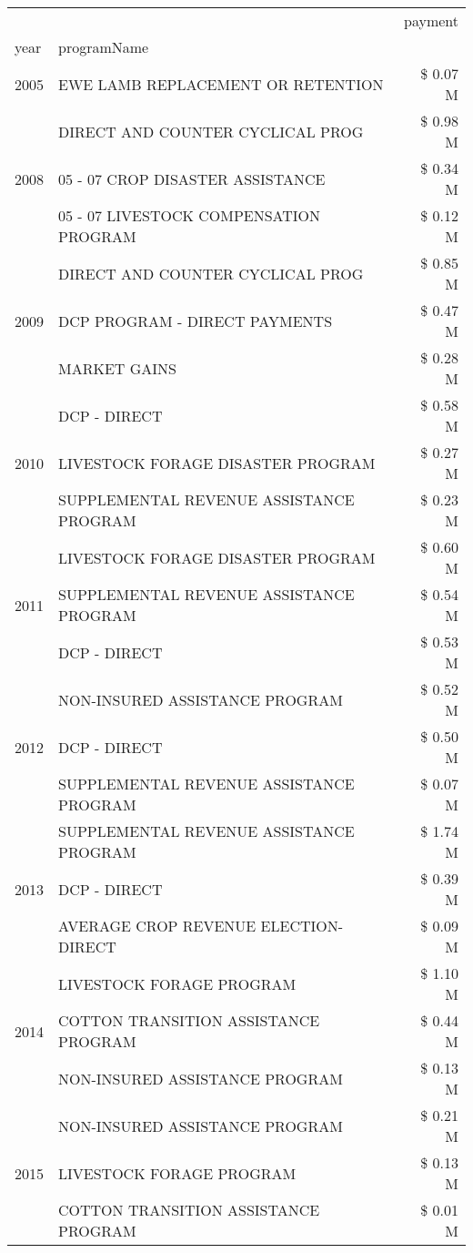 \begin{tabular}{llr}
\toprule
 &  & payment \\
year & programName &  \\
\midrule
2005 & EWE LAMB REPLACEMENT OR RETENTION & \$ 0.07 M \\
\cline{1-3}
\multirow[t]{3}{*}{2008} & DIRECT AND COUNTER CYCLICAL PROG & \$ 0.98 M \\
 & 05 - 07 CROP DISASTER ASSISTANCE & \$ 0.34 M \\
 & 05 - 07 LIVESTOCK COMPENSATION PROGRAM & \$ 0.12 M \\
\cline{1-3}
\multirow[t]{3}{*}{2009} & DIRECT AND COUNTER CYCLICAL PROG & \$ 0.85 M \\
 & DCP PROGRAM - DIRECT PAYMENTS & \$ 0.47 M \\
 & MARKET GAINS & \$ 0.28 M \\
\cline{1-3}
\multirow[t]{3}{*}{2010} & DCP - DIRECT & \$ 0.58 M \\
 & LIVESTOCK FORAGE DISASTER PROGRAM & \$ 0.27 M \\
 & SUPPLEMENTAL REVENUE ASSISTANCE PROGRAM & \$ 0.23 M \\
\cline{1-3}
\multirow[t]{3}{*}{2011} & LIVESTOCK FORAGE DISASTER PROGRAM & \$ 0.60 M \\
 & SUPPLEMENTAL REVENUE ASSISTANCE PROGRAM & \$ 0.54 M \\
 & DCP - DIRECT & \$ 0.53 M \\
\cline{1-3}
\multirow[t]{3}{*}{2012} & NON-INSURED ASSISTANCE PROGRAM & \$ 0.52 M \\
 & DCP - DIRECT & \$ 0.50 M \\
 & SUPPLEMENTAL REVENUE ASSISTANCE PROGRAM & \$ 0.07 M \\
\cline{1-3}
\multirow[t]{3}{*}{2013} & SUPPLEMENTAL REVENUE ASSISTANCE PROGRAM & \$ 1.74 M \\
 & DCP - DIRECT & \$ 0.39 M \\
 & AVERAGE CROP REVENUE ELECTION-DIRECT & \$ 0.09 M \\
\cline{1-3}
\multirow[t]{3}{*}{2014} & LIVESTOCK FORAGE PROGRAM & \$ 1.10 M \\
 & COTTON TRANSITION ASSISTANCE PROGRAM & \$ 0.44 M \\
 & NON-INSURED ASSISTANCE PROGRAM & \$ 0.13 M \\
\cline{1-3}
\multirow[t]{3}{*}{2015} & NON-INSURED ASSISTANCE PROGRAM & \$ 0.21 M \\
 & LIVESTOCK FORAGE PROGRAM & \$ 0.13 M \\
 & COTTON TRANSITION ASSISTANCE PROGRAM & \$ 0.01 M \\

\end{tabular}
